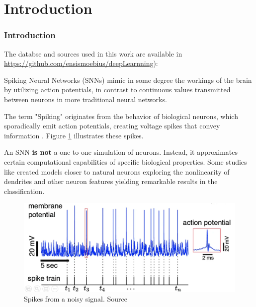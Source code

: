 \section{Introduction}
\begin{frame}[allowframebreaks]
	\frametitle{Introduction}
	
	\par The databse and sources used in this work are available in \url{https://github.com/ensismoebius/deepLearnning}):\newline
	
	\par Spiking Neural Networks (SNNs) mimic in some degree the workings of the brain by utilizing action potentials, in contrast to continuous values transmitted between neurons in more traditional neural networks.\newline
	
	\par The term "Spiking" originates from the behavior of biological neurons, which sporadically emit action potentials, creating voltage spikes that convey information \cite{kasabov2019time}. Figure \ref{fig:neuronspikes} illustrates these spikes.\newline
	
	\par An SNN \textbf{is not} a one-to-one simulation of neurons. Instead, it approximates certain computational capabilities of specific biological properties. Some studies like \cite{jones2020single} created models closer to natural neurons exploring the nonlinearity of dendrites and other neuron features yielding remarkable results in the classification.
	
	\begin{figure}[H]
		\centering
		\includegraphics[width=.8\linewidth]{images/neuronSpikes}
		\caption{Spikes from a noisy signal. Source \cite{dan_goodman_2022_7044500}}
		\label{fig:neuronspikes}
	\end{figure}
\end{frame}

